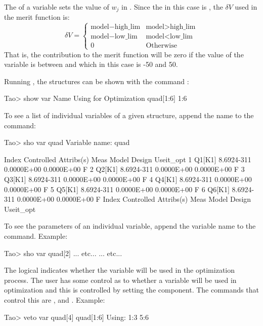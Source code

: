 \documentclass{hitec}     %
\begin{document}
{The  of a variable sets the value of $w_j$ in . Since the  in this case
is , the $\delta V$ used in the merit function is:
\begin{equation}
  \delta V = 
    \begin{cases}
    \mbox{model} - \mbox{high\_lim}  & \mbox{model} > \mbox{high\_lim} \\
    \mbox{model} - \mbox{low\_lim}   & \mbox{model} < \mbox{low\_lim} \\
    0                                & \mbox{Otherwise}
    \end{cases}
\end{equation}
That is, the contribution to the merit function will be zero if the value of the variable is between
 and  which in this case is -50 and 50.

Running \tao, the  structures can be shown with the command : 
\begin{code}
Tao> show var
       Name                                      Using for Optimization
    quad[1:6]                                    1:6
\end{code}

To see a list of individual variables of a given  structure, append the 
name to the  command:
\begin{code}
Tao> sho var quad
Variable name:  quad

 Index  Controlled Attribs(s)    Meas         Model        Design  Useit_opt
     1  Q1[K1]               8.6924-311    0.0000E+00    0.0000E+00       F
     2  Q2[K1]               8.6924-311    0.0000E+00    0.0000E+00       F
     3  Q3[K1]               8.6924-311    0.0000E+00    0.0000E+00       F
     4  Q4[K1]               8.6924-311    0.0000E+00    0.0000E+00       F
     5  Q5[K1]               8.6924-311    0.0000E+00    0.0000E+00       F
     6  Q6[K1]               8.6924-311    0.0000E+00    0.0000E+00       F
 Index  Controlled Attribs(s)    Meas         Model        Design  Useit_opt
\end{code}

To see the parameters of an individual variable, append the variable name to the 
command. Example:
\begin{code}
Tao> sho var quad[2]
... etc...
... etc...
\end{code}
The  logical indicates whether the variable will be used in the optimization process.
The user has some control as to whether a variable will be used in optimization and this is controlled
by setting the  component. The commands that control this are ,  and
. Example:
\begin{code}
Tao> veto var quad[4]
  quad[1:6]                                      Using: 1:3 5:6
\end{code}

}
\end{document}
